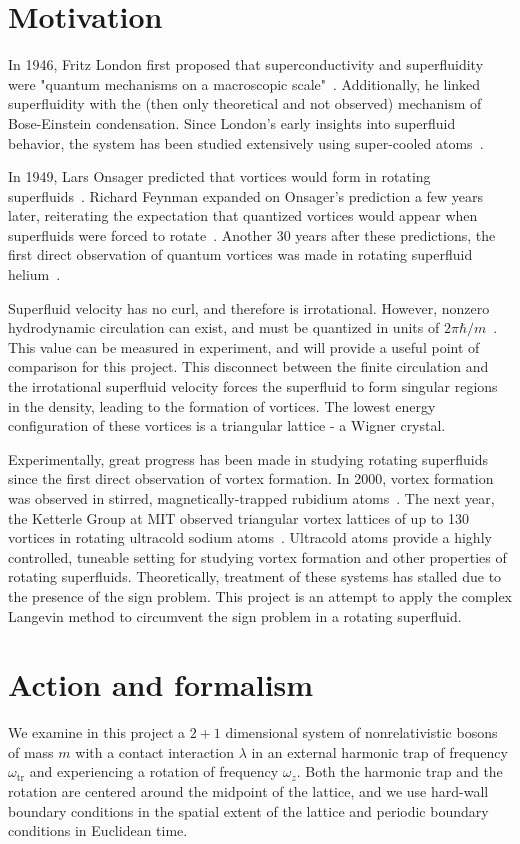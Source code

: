 \documentclass[../../RotatingBosons.tex]{subfiles}
\begin{document}
\section{Motivation}
In 1946, Fritz London first proposed that superconductivity and superfluidity were "quantum mechanisms on a macroscopic scale"~\cite{cern}. Additionally, he linked superfluidity with the (then only theoretical and not observed) mechanism of Bose-Einstein condensation. Since London's early insights into superfluid behavior, the system has been studied extensively using super-cooled atoms~\cite{cern}.

In 1949, Lars Onsager predicted that vortices would form in rotating superfluids~\cite{Onsager1949}. Richard Feynman expanded on Onsager's prediction a few years later, reiterating the expectation that quantized vortices would appear when superfluids were forced to rotate~\cite{FEYNMAN195517}. Another 30 years after these predictions, the first direct observation of quantum vortices was made in rotating superfluid helium~\cite{PhysRevLett43214}.

Superfluid velocity has no curl, and therefore is irrotational. However, nonzero hydrodynamic circulation can exist, and must be quantized in units of $2 \pi \hbar/m$~\cite{cern}. This value can be measured in experiment, and will provide a useful point of comparison for this project. This disconnect between the finite circulation and the irrotational superfluid velocity forces the superfluid to form singular regions in the density, leading to the formation of vortices. The lowest energy configuration of these vortices is a triangular lattice - a Wigner crystal.

Experimentally, great progress has been made in studying rotating superfluids since the first direct observation of vortex formation. In 2000, vortex formation was observed in stirred, magnetically-trapped rubidium atoms~\cite{PhysRevLett84806}. The next year, the Ketterle Group at MIT observed triangular vortex lattices of up to 130 vortices in rotating ultracold sodium atoms~\cite{Science20012925516}. Ultracold atoms provide a highly controlled, tuneable setting for studying vortex formation and other properties of rotating superfluids. Theoretically, treatment of these systems has stalled due to the presence of the sign problem. This project is an attempt to apply the complex Langevin method to circumvent the sign problem in a rotating superfluid.

\section{Action and formalism}
We examine in this project a $2+1$ dimensional system of nonrelativistic bosons of mass $m$ with a contact interaction $\lambda$ in an external harmonic trap of frequency $\omega_{\mathrm{tr}}$ and experiencing a rotation of frequency $\omega_{z}$. Both the harmonic trap and the rotation are centered around the midpoint of the lattice, and we use hard-wall boundary conditions in the spatial extent of the lattice and periodic boundary conditions in Euclidean time.
\end{document}
